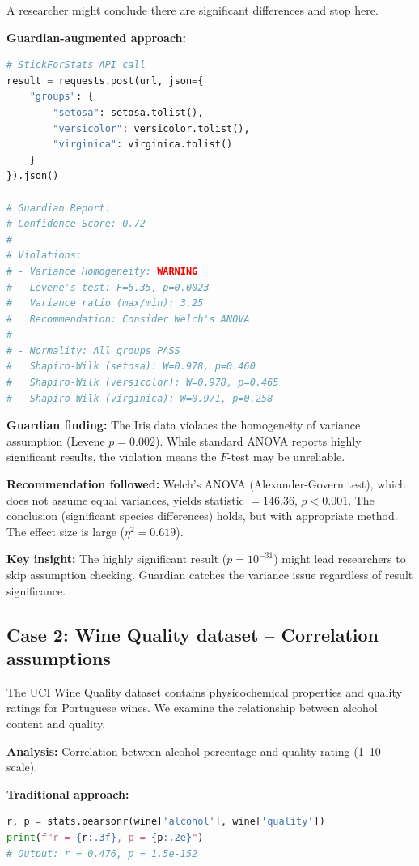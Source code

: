 \documentclass[article]{jss}
\begin{document}
A researcher might conclude there are significant differences and stop here.

\textbf{Guardian-augmented approach:}

\begin{lstlisting}[language=Python]
# StickForStats API call
result = requests.post(url, json={
    "groups": {
        "setosa": setosa.tolist(),
        "versicolor": versicolor.tolist(),
        "virginica": virginica.tolist()
    }
}).json()

# Guardian Report:
# Confidence Score: 0.72
#
# Violations:
# - Variance Homogeneity: WARNING
#   Levene's test: F=6.35, p=0.0023
#   Variance ratio (max/min): 3.25
#   Recommendation: Consider Welch's ANOVA
#
# - Normality: All groups PASS
#   Shapiro-Wilk (setosa): W=0.978, p=0.460
#   Shapiro-Wilk (versicolor): W=0.978, p=0.465
#   Shapiro-Wilk (virginica): W=0.971, p=0.258
\end{lstlisting}

\textbf{Guardian finding:} The Iris data violates the homogeneity of variance assumption (Levene $p = 0.002$). While standard ANOVA reports highly significant results, the violation means the $F$-test may be unreliable.

\textbf{Recommendation followed:} Welch's ANOVA (Alexander-Govern test), which does not assume equal variances, yields statistic $= 146.36$, $p < 0.001$. The conclusion (significant species differences) holds, but with appropriate method. The effect size is large ($\eta^2 = 0.619$).

\textbf{Key insight:} The highly significant result ($p = 10^{-31}$) might lead researchers to skip assumption checking. Guardian catches the variance issue regardless of result significance.

\subsection{Case 2: Wine Quality dataset -- Correlation assumptions}

The UCI Wine Quality dataset \citep{cortez2009wine} contains physicochemical properties and quality ratings for Portuguese wines. We examine the relationship between alcohol content and quality.

\textbf{Analysis:} Correlation between alcohol percentage and quality rating (1--10 scale).

\textbf{Traditional approach:}
\begin{lstlisting}[language=Python]
r, p = stats.pearsonr(wine['alcohol'], wine['quality'])
print(f"r = {r:.3f}, p = {p:.2e}")
# Output: r = 0.476, p = 1.5e-152
\end{lstlisting}
\end{document}
